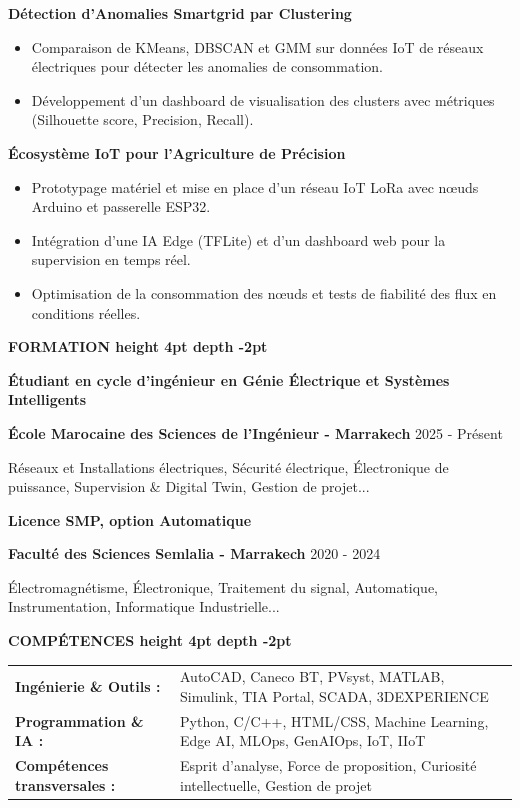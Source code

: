 \documentclass[10pt,a4paper]{altacv}
\renewcommand{\cvsection}[2][]{%
  \medskip%
  {\color{heading}\LARGE\bfseries #2 \hspace{0.2em}\leaders\vrule height 4pt depth -2pt\hfill\mbox{}}\par\smallskip
}
\renewcommand{\cvevent}[4]{%
  {\large\bfseries\color{accent}#1\par}
  \smallskip\normalsize
  \ifstrequal{#2}{}{}{%
    \textbf{\color{emphasis}#2\ifstrequal{#4}{}{}{ - #4}}%
  }%
  \hfill
  \ifstrequal{#3}{}{}{{\small#3}}%
  \par\smallskip
}
\begin{document}
{\large\bfseries\color{accent} Détection d'Anomalies Smartgrid par Clustering}
\begin{itemize}
  \item Comparaison de KMeans, DBSCAN et GMM sur données IoT de réseaux électriques pour détecter les anomalies de consommation.
  \item Développement d'un dashboard de visualisation des clusters avec métriques (Silhouette score, Precision, Recall).
\end{itemize}

{\large\bfseries\color{accent} Écosystème IoT pour l'Agriculture de Précision}
\begin{itemize}
  \item Prototypage matériel et mise en place d'un réseau IoT LoRa avec nœuds Arduino et passerelle ESP32.
  \item Intégration d'une IA Edge (TFLite) et d'un dashboard web pour la supervision en temps réel.
  \item Optimisation de la consommation des nœuds et tests de fiabilité des flux en conditions réelles.
\end{itemize}

\cvsection{FORMATION}
\cvevent{Étudiant en cycle d'ingénieur en Génie Électrique et Systèmes Intelligents}{École Marocaine des Sciences de l'Ingénieur}{2025 - Présent}{Marrakech}
\small Réseaux et Installations électriques, Sécurité électrique, Électronique de puissance, Supervision \& Digital Twin, Gestion de projet...

\cvevent{Licence SMP, option Automatique}{Faculté des Sciences Semlalia}{2020 - 2024}{Marrakech}
\small Électromagnétisme, Électronique, Traitement du signal, Automatique, Instrumentation, Informatique Industrielle...

\cvsection{COMPÉTENCES}
\begin{tabular}{@{}ll@{}}
\textbf{Ingénierie \& Outils :} & AutoCAD, Caneco BT, PVsyst, MATLAB, Simulink, TIA Portal, SCADA, 3DEXPERIENCE \\[2pt]
\textbf{Programmation \& IA :} & Python, C/C++, HTML/CSS, Machine Learning, Edge AI, MLOps, GenAIOps, IoT, IIoT \\[2pt]
\textbf{Compétences transversales :} & Esprit d'analyse, Force de proposition, Curiosité intellectuelle, Gestion de projet \\
\end{tabular}
\end{document}
